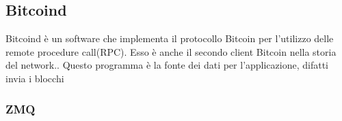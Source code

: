 \subsection{Bitcoind}
\label{sec:bitcoind}
Bitcoind è un software che implementa il protocollo Bitcoin per l'utilizzo delle remote procedure call(RPC). Esso è anche il secondo client Bitcoin nella storia del network.\cite{wiki:bitcoind}.
Questo programma è la fonte dei dati per l'applicazione, difatti invia i blocchi  


\subsubsection{ZMQ}
\label{sec:ZMQ}
